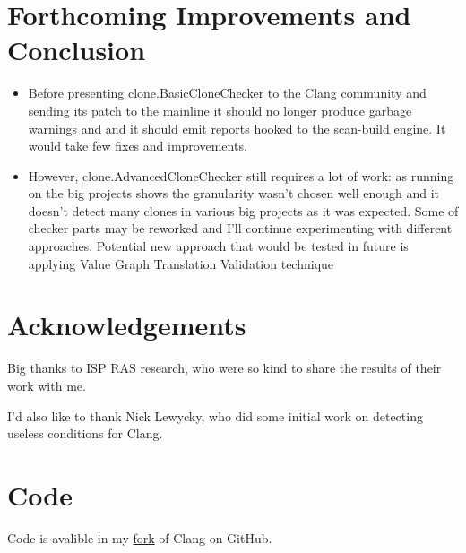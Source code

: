 \documentclass[a0,portrait]{a0poster}
\begin{document}
\begin{multicols}{2}
\section*{Forthcoming Improvements and Conclusion}

\begin{itemize}
\item Before presenting clone.BasicCloneChecker to the Clang community and sending its patch to 
the mainline it should no longer produce garbage warnings and and it should emit reports hooked to 
the scan-build engine. It would take few fixes and improvements.
\item However, clone.AdvancedCloneChecker still requires a lot of work: as running on the big 
projects shows the granularity wasn't chosen well enough and it doesn't detect many clones in
various big projects as it was expected. Some of checker parts may be reworked and I'll continue
experimenting with different approaches. Potential new approach that would be tested in future
is applying Value Graph Translation Validation technique \cite{ValueGraphLLVM}
\end{itemize}


\nocite{*} %


\section*{Acknowledgements}

Big thanks to ISP RAS research, who were so kind to share the results of their work with me.

I'd also like to thank Nick Lewycky, who did some initial work on detecting useless conditions
for Clang.


\section*{Code}

Code is avalible in my \href{https://github.com/omtcyf0/clang}{fork} of Clang on GitHub.


\end{multicols}
\end{document}
